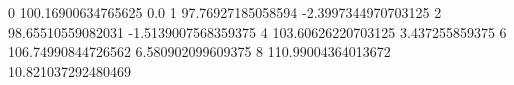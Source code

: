 0 100.16900634765625 0.0
1 97.76927185058594 -2.3997344970703125
2 98.65510559082031 -1.5139007568359375
4 103.60626220703125 3.437255859375
6 106.74990844726562 6.580902099609375
8 110.99004364013672 10.821037292480469

